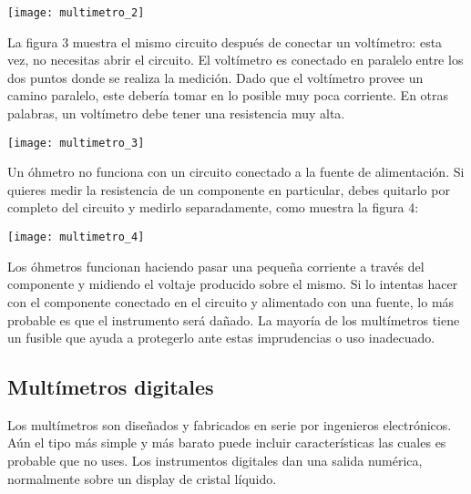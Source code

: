 \documentclass[11pt]{article}
\newenvironment{Figuras}
  {\par\medskip\noindent\minipage{\linewidth}}
  {\endminipage\par\medskip}
\begin{document}
\begin{multicols}{2}
\begin{Figuras}
	\centering
    \texttt{[image: multimetro\_2]}
    \label{fig:mesh2}
\end{Figuras}


La figura 3  muestra el mismo circuito después de conectar un
voltímetro: esta vez, no necesitas abrir el circuito. El voltímetro es
conectado en paralelo entre los dos puntos donde se realiza la
medición. Dado que el voltímetro provee un camino paralelo, este
debería tomar en lo posible muy poca corriente. En otras palabras, un
voltímetro debe tener una resistencia muy alta.

\begin{Figuras}
	\centering
    \texttt{[image: multimetro\_3]}
    \label{fig:mesh3}
\end{Figuras}

Un óhmetro no funciona con un circuito conectado
a la fuente de alimentación. Si quieres medir la
resistencia de un componente en particular, debes
quitarlo por completo del circuito y medirlo
separadamente, como muestra la figura 4:

\begin{Figuras}
	\centering
    \texttt{[image: multimetro\_4]}
    \label{fig:mesh4}
\end{Figuras}

Los óhmetros funcionan haciendo pasar una pequeña corriente a través del componente y midiendo el
voltaje producido sobre el mismo. Si lo intentas hacer con el componente conectado en el circuito y
alimentado con una fuente, lo más probable es que el instrumento será dañado. La mayoría de los
multímetros tiene un fusible que ayuda a protegerlo ante estas imprudencias o uso inadecuado.

	\subsection{Multímetros digitales}
Los multímetros son diseñados y fabricados en serie por
ingenieros electrónicos. Aún el tipo más simple y más barato
puede incluir características las cuales es probable que no
uses. Los instrumentos digitales dan una salida numérica,
normalmente sobre un display de cristal líquido.


\end{multicols}
\end{document}
